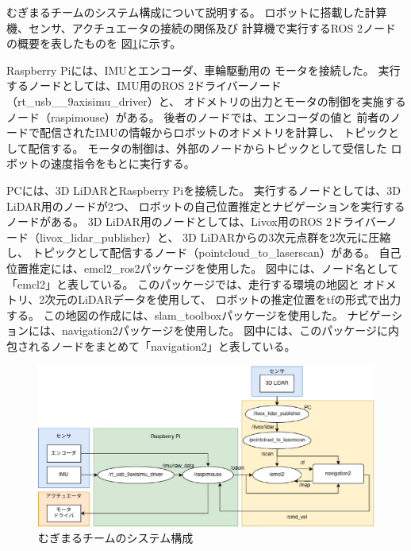 むぎまるチームのシステム構成について説明する。
ロボットに搭載した計算機、センサ、アクチュエータの接続の関係及び
計算機で実行するROS 2ノードの概要を表したものを
図\ref{fig:mugimaru_system}に示す。

Raspberry Piには、IMUとエンコーダ、車輪駆動用の
モータを接続した。
実行するノードとしては、IMU用のROS 2ドライバーノード（rt\_usb_\_9axisimu_driver）と、
オドメトリの出力とモータの制御を実施するノード（raspimouse）がある。
後者のノードでは、エンコーダの値と
前者のノードで配信されたIMUの情報からロボットのオドメトリを計算し、
トピックとして配信する。
モータの制御は、外部のノードからトピックとして受信した
ロボットの速度指令をもとに実行する。

PCには、3D LiDARとRaspberry Piを接続した。
実行するノードとしては、3D LiDAR用のノードが2つ、
ロボットの自己位置推定とナビゲーションを実行するノードがある。
3D LiDAR用のノードとしては、Livox用のROS 2ドライバーノード（livox\_lidar\_publisher）と、
3D LiDARからの3次元点群を2次元に圧縮し、
トピックとして配信するノード（pointcloud\_to\_laserscan）がある。
自己位置推定には、emcl2\_ros2パッケージ\cite{emcl2_ros2}を使用した。
図中には、ノード名として「emcl2」と表している。
このパッケージでは、走行する環境の地図と
オドメトリ、2次元のLiDARデータを使用して、
ロボットの推定位置をtfの形式で出力する。
この地図の作成には、slam\_toolboxパッケージ\cite{slam_toolbox}を使用した。
ナビゲーションには、navigation2パッケージ\cite{nav2}を使用した。
図中には、このパッケージに内包されるノードをまとめて「navigation2」と表している。

\begin{figure}[h]
  \begin{center}
    \includegraphics[width=1.0\linewidth]{figs/mugimaru_system_2024.eps}
    \caption{むぎまるチームのシステム構成}
    \label{fig:mugimaru_system}
  \end{center}
\end{figure}

